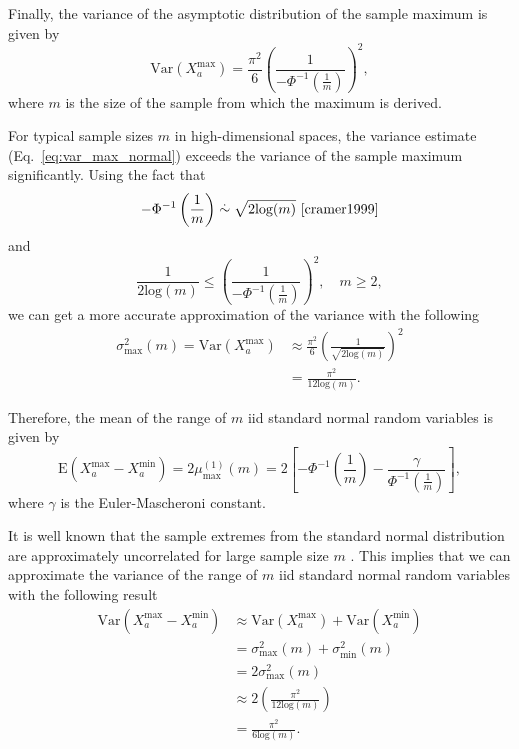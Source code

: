 \documentclass[aos]{imsart}
\begin{document}
Finally, the variance of the asymptotic distribution of the sample maximum is given by
%
\begin{equation}\label{eq:var_max_normal}
\text{Var}(X^\text{max}_a) = \frac{\pi^2}{6}\left(\frac{1}{-\Phi^{-1}\left(\frac{1}{m}\right)}\right)^2,
\end{equation}
%
where $m$ is the size of the sample from which the maximum is derived.

For typical sample sizes $m$ in high-dimensional spaces, the variance estimate (Eq.~\ref{eq:var_max_normal}) exceeds the variance of the sample maximum significantly. Using the fact that
%
\[
-\Phi^{-1}\left(\frac{1}{m}\right) \overset{.}{\sim} \sqrt{2 \text{log}(m)}~\text{\cite{cramer1999}}
\] 
%
and 
%
\[
\frac{1}{2 \text{log}(m)} \leq \left(\frac{1}{-\Phi^{-1}\left(\frac{1}{m}\right)}\right)^2, \quad m \geq 2,
\] 
%
we can get a more accurate approximation of the variance with the following
%
\begin{equation}\label{eq:var_max_normal_improved}
\begin{aligned}
\sigma^2_\text{max}(m) = \text{Var}(X^\text{max}_a) &\approx \frac{\pi^2}{6}\left(\frac{1}{\sqrt{2\text{log}(m)}}\right)^2 \\
&= \frac{\pi^2}{12\text{log}(m)}.
\end{aligned}
\end{equation}

Therefore, the mean of the range of $m$ iid standard normal random variables is given by
%
\begin{equation}\label{eq:mu_rng_normal}
\text{E}(X^\text{max}_a - X^\text{min}_a) = 2\mu^{(1)}_\text{max}(m) = 2\left[-\Phi^{-1} \left(\frac{1}{m}\right) - \frac{\gamma}{\Phi^{-1}\left(\frac{1}{m}\right)}\right],
\end{equation}
%
where $\gamma$ is the Euler-Mascheroni constant.

It is well known that the sample extremes from the standard normal distribution are approximately uncorrelated for large sample size $m$ \cite{gumbel1947}. This implies that we can approximate the variance of the range of $m$ iid standard normal random variables with the following result
%
\begin{equation}\label{eq:var_rng_normal}
\begin{aligned}
\text{Var}(X^\text{max}_a - X^\text{min}_a) &\approx \text{Var}(X^\text{max}_a) + \text{Var}(X^\text{min}_a) \\
&= \sigma^2_\text{max}(m) + \sigma^2_\text{min}(m) \\
&= 2\sigma^2_\text{max}(m) \\
&\approx 2\left(\frac{\pi^2}{12\text{log}(m)}\right) \\
&= \frac{\pi^2}{6\text{log}(m)}.
\end{aligned}
\end{equation}
\end{document}
